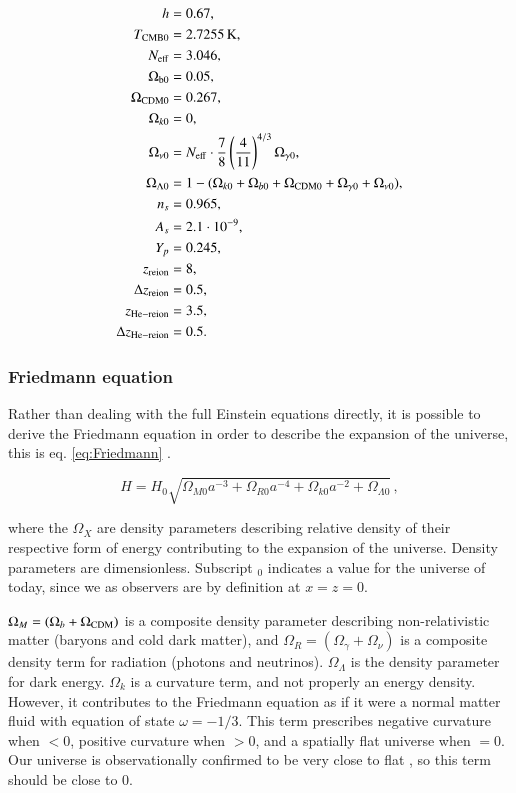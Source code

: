 \begin{equation}\label{eq:input_params}
\begin{aligned}
h &= 0.67, \\
T_{\rm CMB 0} &= 2.7255\,\unit{K}, \\
N_{\rm eff} &= 3.046, \\
\Omega_{\rm b 0} &= 0.05, \\
\Omega_{\rm CDM 0} &= 0.267,\\
\Omega_{k 0} &= 0, \\
\Omega_{\nu 0} &= N_{\rm eff}\cdot \frac{7}{8}\left(\frac{4}{11}\right)^{4/3}\Omega_{\gamma 0}, \\
\Omega_{\Lambda 0} &= 1 - (\Omega_{k 0}+\Omega_{b 0}+\Omega_{\rm CDM 0}+\Omega_{\gamma 0}+\Omega_{\nu 0}),\\
n_s &= 0.965, \\
A_s &= 2.1\cdot 10^{-9}, \\
Y_p &= 0.245, \\
z_{\rm reion} &= 8, \\
\Delta z_{\rm reion} &= 0.5, \\
z_{\rm He-reion} &= 3.5, \\
\Delta z_{\rm He-reion} &= 0.5.
\end{aligned}
\end{equation}

\subsubsection{Friedmann equation}
Rather than dealing with the full Einstein equations directly, it is possible to derive the Friedmann equation in order to describe the expansion of the universe, this is eq. \ref{eq:Friedmann} \citep{wintherCosmologyIILecture2024}.

\begin{equation}\label{eq:Friedmann}
\boxed{H = H_0 \sqrt{ \Omega_{M 0} a^{-3} + \Omega_{R 0} a^{-4} + \Omega_{k 0} a^{-2} + \Omega_{\Lambda 0}}}\,,
\end{equation}

where the $\Omega_{X}$ are density parameters describing relative density of their respective form of energy contributing to the expansion of the universe. Density parameters are dimensionless. Subscript $_0$ indicates a value for the universe of today, since we as observers are by definition at $x=z=0$.

$\Omega_{M} = (\Omega_{b}+\Omega_{\rm CDM})$ is a composite density parameter describing non-relativistic matter (baryons and cold dark matter), and $\Omega_{R} = (\Omega_{\gamma} + \Omega_{\nu})$ is a composite density term for radiation (photons and neutrinos).
$\Omega_{\Lambda}$ is the density parameter for dark energy.
$\Omega_{k}$ is a curvature term, and not properly an energy density. However, it contributes to the Friedmann equation as if it were a normal matter fluid with equation of state $\omega = -1/3$. This term prescribes negative curvature when $<0$, positive curvature when $>0$, and a spatially flat universe when $=0$. Our universe is observationally confirmed to be very close to flat \citep{bennettNineYearWilkinsonMicrowave2013}, so this term should be close to $0$. 

